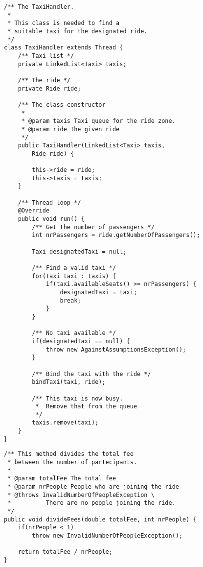 \begin{lstlisting}[frame=single]
/** The TaxiHandler.
 *
 * This class is needed to find a 
 * suitable taxi for the designated ride.
 */
class TaxiHandler extends Thread {
    /** Taxi list */
    private LinkedList<Taxi> taxis;

    /** The ride */
    private Ride ride;

    /** The class constructor 
     *
     * @param taxis Taxi queue for the ride zone.
     * @param ride The given ride
     */
    public TaxiHandler(LinkedList<Taxi> taxis, 
        Ride ride) {

        this->ride = ride;
        this->taxis = taxis;
    }

    /** Thread loop */
    @Override
    public void run() {
        /** Get the number of passengers */
        int nrPassengers = ride.getNumberOfPassengers();

        Taxi designatedTaxi = null;

        /** Find a valid taxi */
        for(Taxi taxi : taxis) {
            if(taxi.availableSeats() >= nrPassengers) {
                designatedTaxi = taxi;
                break;
            }
        }

        /** No taxi available */
        if(designatedTaxi == null) {
            throw new AgainstAssumptionsException();
        }

        /** Bind the taxi with the ride */
        bindTaxi(taxi, ride);
        
        /** This taxi is now busy. 
         *  Remove that from the queue 
         */
        taxis.remove(taxi);
    }
}
\end{lstlisting}

\begin{lstlisting}[frame=single]
/** This method divides the total fee 
 * between the number of partecipants.
 * 
 * @param totalFee The total fee
 * @param nrPeople People who are joining the ride
 * @throws InvalidNumberOfPeopleException \
 *          There are no people joining the ride.
 */
public void divideFees(double totalFee, int nrPeople) {
    if(nrPeople < 1)
        throw new InvalidNumberOfPeopleException();

    return totalFee / nrPeople;
}
\end{lstlisting}

